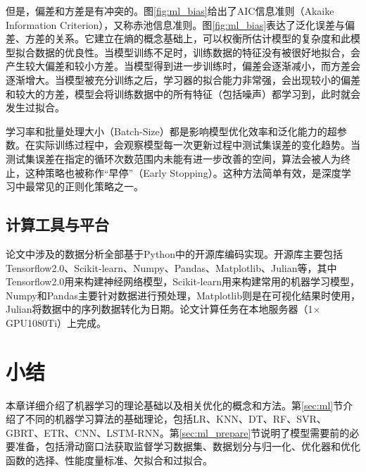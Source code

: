 但是，偏差和方差是有冲突的。图\ref{fig:ml_bias}给出了AIC信息准则（Akaike Information Criterion），又称赤池信息准则。图\ref{fig:ml_bias}表达了泛化误差与偏差、方差的关系。它建立在熵的概念基础上，可以权衡所估计模型的复杂度和此模型拟合数据的优良性。当模型训练不足时，训练数据的特征没有被很好地拟合，会产生较大偏差和较小方差。当模型得到进一步训练时，偏差会逐渐减小，而方差会逐渐增大。当模型被充分训练之后，学习器的拟合能力非常强，会出现较小的偏差和较大的方差，模型会将训练数据中的所有特征（包括噪声）都学习到，此时就会发生过拟合。

学习率和批量处理大小（Batch-Size）都是影响模型优化效率和泛化能力的超参数。在实际训练过程中，会观察模型每一次更新过程中测试集误差的变化趋势。当测试集误差在指定的循环次数范围内未能有进一步改善的空间，算法会被人为终止，这种策略也被称作“早停”（Early Stopping）。这种方法简单有效，是深度学习中最常见的正则化策略之一。

\subsection{计算工具与平台}\label{sec:ml_computer}

论文中涉及的数据分析全部基于Python中的开源库编码实现。开源库主要包括Tensorflow2.0、Scikit-learn、Numpy、Pandas、Matplotlib、Julian等，其中Tensorflow2.0用来构建神经网络模型，Scikit-learn用来构建常用的机器学习模型，Numpy和Pandas主要针对数据进行预处理，Matplotlib则是在可视化结果时使用，Julian将数据中的序列数据转化为日期。论文计算任务在本地服务器（1$\times$GPU1080Ti）上完成。

\section{小结}\label{sec:ml_conclusion}

本章详细介绍了机器学习的理论基础以及相关优化的概念和方法。第\ref{sec:ml}节介绍了不同的机器学习算法的基础理论，包括LR、KNN、DT、RF、SVR、GBRT、ETR、CNN、LSTM-RNN。第\ref{sec:ml_prepare}节说明了模型需要前的必要准备，包括滑动窗口法获取监督学习数据集、数据划分与归一化、优化器和优化函数的选择、性能度量标准、欠拟合和过拟合。

